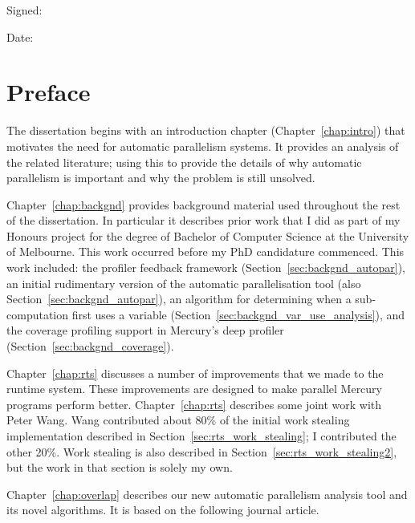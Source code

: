 \documentclass[a4paper,twoside,openright]{report}
\begin{document}
\vspace{1em}

\noindent Signed:

\vspace{1em}

\noindent Date:

\chapter*{Preface}

The dissertation begins with an introduction chapter
(Chapter~\ref{chap:intro}) that
motivates the need for automatic parallelism systems.
It provides an analysis of the related literature;
using this to provide the details of why automatic parallelism is important
and why the problem is still unsolved.

Chapter~\ref{chap:backgnd} provides background material used throughout the
rest of the dissertation.
In particular it describes prior work 
that I did as part of my Honours project
for the degree of Bachelor of Computer Science at the University of Melbourne.
This work occurred before my PhD candidature commenced.
This work included:
the profiler feedback framework (Section~\ref{sec:backgnd_autopar}),
an initial rudimentary version of the automatic
parallelisation tool (also Section~\ref{sec:backgnd_autopar}),
an algorithm for determining when a sub-computation first uses
a variable (Section~\ref{sec:backgnd_var_use_analysis}),
and the coverage profiling support in Mercury's deep profiler
(Section~\ref{sec:backgnd_coverage}).

Chapter~\ref{chap:rts} discusses a number of improvements that we made to
the runtime system.
These improvements are designed to make parallel Mercury programs perform
better.
Chapter~\ref{chap:rts} describes some joint work with Peter Wang.
Wang contributed about 80\% of the initial work stealing implementation 
described in Section~\ref{sec:rts_work_stealing};
I contributed the other 20\%.
Work stealing is also described in Section~\ref{sec:rts_work_stealing2},
but the work in that section is solely my own.

Chapter~\ref{chap:overlap} describes our new automatic parallelism
analysis tool and its novel algorithms.
It is based on the following journal article.

\begin{quote}
\end{quote}
\end{document}
